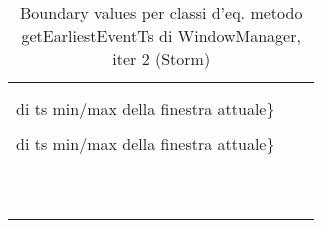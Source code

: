 \documentclass[10pt, a4paper]{article}
\newcommand{\Intmaketable}[4]{
	\begin{longtable}{#3}
	#4
	\caption{#2}
	\label{#1}
	\end{longtable}
}
\newcommand{\Intbvtable}[3]{
	\Intmaketable{#1}{#2}{|l|l|l|}{
	\hline
	\thead{Parametro formale} & \thead{Classe d'equivalenza} & \thead{Boundary value}\\
	\hline
	\hline
	#3
	\hline}
}
\newcommand{\Intbvcaption}[4]{Boundary values per classi d'eq. metodo #1 di #2, iter #3 (#4)}
\newcommand{\gettablelabel}[5]{table:#1:#2:#3:iter#4:proj#5}
\newcommand{\bvtable}[5]{
	\Intbvtable{\gettablelabel{bv}{#1}{#2}{#3}{#4}}
		{\Intbvcaption{#1}{#2}{#3}{#4}}
		{#5}
}
\newcommand{\tcell}{\makecell[tl]}
\newcommand{\newtrow}{\\ \hline}
\def\storm{Storm}
\newcommand{\ceq}[1]{\{#1\}}
\begin{document}
	\bvtable{getEarliestEventTs}{WindowManager}{2}{\storm}{
			\tcell{startTs} &
			\tcell{\ceq{$< 0$}} &
			\tcell{$-1$}
		\newtrow
			\tcell{startTs} &
			\tcell{\ceq{timestamp $\ge 0$ che non è nel range\\ di ts min/max della finestra attuale}} &
			\tcell{$0$}
		\newtrow
			\tcell{startTs} &
			\tcell{\ceq{timestamp $\ge 0$ di evento che è nel range\\ di ts min/max della finestra attuale}} &
			\tcell{$t(e_1)$}
		\newtrow
			\tcell{endTs} &
			\tcell{\ceq{=startTs}} &
			\tcell{$-1$}
		\newtrow
			\tcell{endTs} &
			\tcell{\ceq{=startTs}} &
			\tcell{$0$}
		\newtrow
			\tcell{endTs} &
			\tcell{\ceq{=startTs}} &
			\tcell{$t(e_1)$}
		\newtrow
			\tcell{endTs} &
			\tcell{\ceq{>startTs}} &
			\tcell{$0$}
		\newtrow
			\tcell{endTs} &
			\tcell{\ceq{>startTs}} &
			\tcell{$1$}
		\newtrow
			\tcell{endTs} &
			\tcell{\ceq{>startTs}} &
			\tcell{$t(e_1)+1$}
		\newtrow
			\tcell{endTs} &
			\tcell{\ceq{<startTs}} &
			\tcell{$-2$}
		\newtrow
			\tcell{endTs} &
			\tcell{\ceq{<startTs}} &
			\tcell{$-1$}
		\newtrow
			\tcell{endTs} &
			\tcell{\ceq{<startTs}} &
			\tcell{$t(e_1)-1$}
		\newtrow
	}
	
\end{document}
